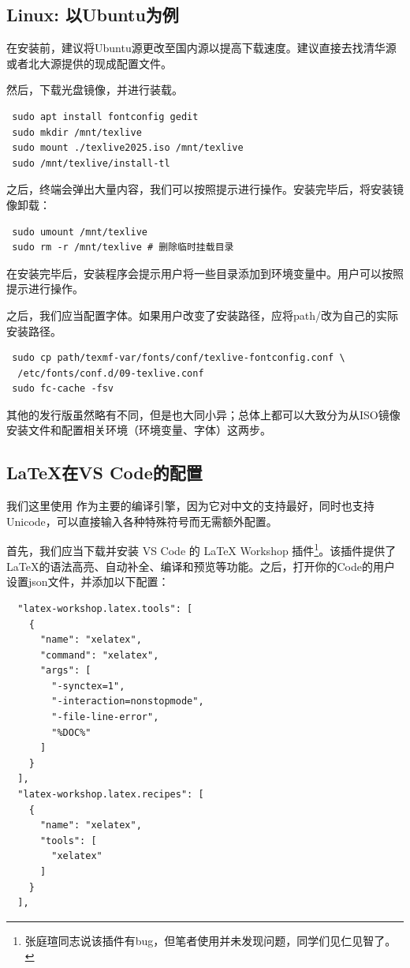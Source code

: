 \subsection{Linux: 以Ubuntu为例}

在安装前，建议将Ubuntu源更改至国内源以提高下载速度。建议直接去找清华源或者北大源提供的现成配置文件。

然后，下载光盘镜像，并进行装载。

\begin{verbatim}
 sudo apt install fontconfig gedit
 sudo mkdir /mnt/texlive
 sudo mount ./texlive2025.iso /mnt/texlive
 sudo /mnt/texlive/install-tl
\end{verbatim}

之后，终端会弹出大量内容，我们可以按照提示进行操作。安装完毕后，将安装镜像卸载：

\begin{verbatim}
 sudo umount /mnt/texlive
 sudo rm -r /mnt/texlive # 删除临时挂载目录
\end{verbatim}

在安装完毕后，安装程序会提示用户将一些目录添加到环境变量中。用户可以按照提示进行操作。

之后，我们应当配置字体。如果用户改变了安装路径，应将path/改为自己的实际安装路径。

\begin{verbatim}
 sudo cp path/texmf-var/fonts/conf/texlive-fontconfig.conf \
  /etc/fonts/conf.d/09-texlive.conf
 sudo fc-cache -fsv
\end{verbatim}

其他的发行版虽然略有不同，但是也大同小异；总体上都可以大致分为从ISO镜像安装文件和配置相关环境（环境变量、字体）这两步。

\subsection{ \LaTeX 在VS Code的配置}

我们这里使用 \XeLaTeX 作为主要的编译引擎，因为它对中文的支持最好，同时也支持Unicode，可以直接输入各种特殊符号而无需额外配置。

首先，我们应当下载并安装 VS Code 的 LaTeX Workshop 插件\footnote{张庭瑄同志说该插件有bug，但笔者使用并未发现问题，同学们见仁见智了。}。该插件提供了 \LaTeX 的语法高亮、自动补全、编译和预览等功能。之后，打开你的Code的用户设置json文件，并添加以下配置：

\begin{verbatim}
  "latex-workshop.latex.tools": [
    {
      "name": "xelatex",
      "command": "xelatex",
      "args": [
        "-synctex=1",
        "-interaction=nonstopmode",
        "-file-line-error",
        "%DOC%"
      ]
    }
  ],
  "latex-workshop.latex.recipes": [
    {
      "name": "xelatex",
      "tools": [
        "xelatex"
      ]
    }
  ],
\end{verbatim}

